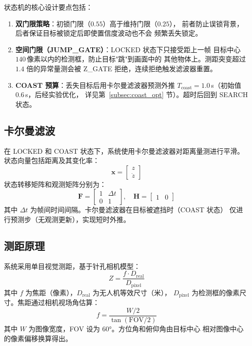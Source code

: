 \documentclass[12pt, a4paper]{ctexart}
\begin{document}
状态机的核心设计要点包括：

\begin{enumerate}
  \item \textbf{双门限策略}：初锁门限（$0.55$）高于维持门限（$0.25$），
        前者防止误锁背景，后者保证目标被锁定后即使置信度波动也不会
        频繁丢失锁定。

  \item \textbf{空间门限（JUMP\_GATE）}：LOCKED 状态下只接受距上一帧
        目标中心 $140$\,像素以内的检测框，防止目标"跳"到画面中的
        其他物体上。测距突变超过 $1.4$ 倍的异常量测会被
        Z\_GATE 拒绝，连续拒绝触发滤波器重置。

  \item \textbf{COAST 预算}：丢失目标后用卡尔曼滤波器预测外推
        $T_{\text{coast}} = 1.0$\,s（初始值 $0.6$\,s，后经实验优化，
        详见第~\ref{subsec:coast_opt} 节）。超时后回到 SEARCH 状态。
\end{enumerate}

\subsection{卡尔曼滤波}

在 LOCKED 和 COAST 状态下，系统使用卡尔曼滤波器对距离量测进行平滑。
状态向量包括距离及其变化率：
\[
\mathbf{x} = \begin{bmatrix} z \\ \dot{z} \end{bmatrix}
\]
状态转移矩阵和观测矩阵分别为：
\[
\mathbf{F} = \begin{bmatrix} 1 & \Delta t \\ 0 & 1 \end{bmatrix}, \quad
\mathbf{H} = \begin{bmatrix} 1 & 0 \end{bmatrix}
\]
其中 $\Delta t$ 为帧间时间间隔。卡尔曼滤波器在目标被遮挡时（COAST 状态）
仅进行预测步（无观测更新），实现短时外推。

\subsection{测距原理}

系统采用单目视觉测距，基于针孔相机模型：
\begin{equation}
Z = \frac{f \cdot D_{\text{real}}}{D_{\text{pixel}}}
\label{eq:range}
\end{equation}
其中 $f$ 为焦距（像素），$D_{\text{real}}$ 为无人机等效尺寸（米），
$D_{\text{pixel}}$ 为检测框的像素尺寸。焦距通过相机视场角估算：
\[
f = \frac{W/2}{\tan(\text{FOV}/2)}
\]
其中 $W$ 为图像宽度，FOV 设为 $60°$。方位角和俯仰角由目标中心
相对图像中心的像素偏移换算得出。
\end{document}
